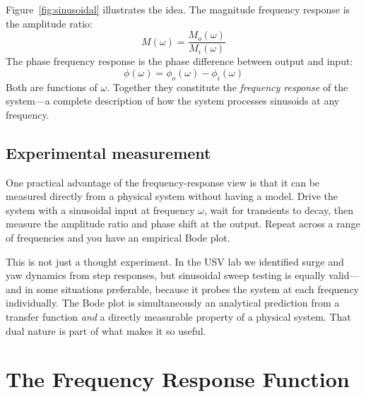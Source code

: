 \documentclass[../../book.tex]{subfiles}
\begin{document}
Figure~\ref{fig:sinusoidal} illustrates the idea.  The magnitude frequency
response is the amplitude ratio:
\begin{equation}
  M(\omega) = \frac{M_o(\omega)}{M_i(\omega)}
  \label{eq:mag_response}
\end{equation}
The phase frequency response is the phase difference between output and input:
\begin{equation}
  \phi(\omega) = \phi_o(\omega) - \phi_i(\omega)
  \label{eq:phase_response}
\end{equation}
Both are functions of $\omega$.  Together they constitute the \emph{frequency
response} of the system---a complete description of how the system processes
sinusoids at any frequency.

\subsection{Experimental measurement}
\label{sec:experimental}

One practical advantage of the frequency-response view is that it can be
measured directly from a physical system without having a model.  Drive the
system with a sinusoidal input at frequency $\omega$, wait for transients to
decay, then measure the amplitude ratio and phase shift at the output.  Repeat
across a range of frequencies and you have an empirical Bode plot.

This is not just a thought experiment.  In the USV lab we identified surge and
yaw dynamics from step responses, but sinusoidal sweep testing is equally
valid---and in some situations preferable, because it probes the system at
each frequency individually.  The Bode plot is simultaneously an analytical
prediction from a transfer function \emph{and} a directly measurable property
of a physical system.  That dual nature is part of what makes it so useful.

\section{The Frequency Response Function}
\label{sec:G_jomega}

\end{document}
